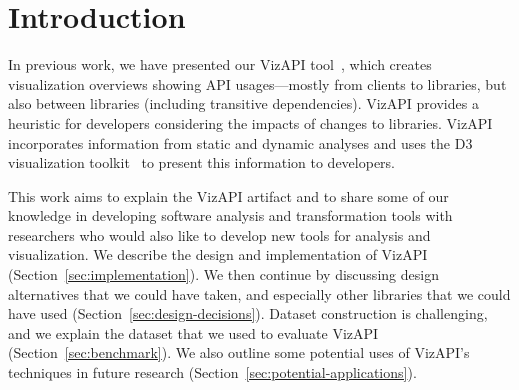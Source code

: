 \section{Introduction}
\label{sec:introduction}

In previous work, we have presented our VizAPI tool~\cite{venkatanarayanan22:_vizap,venkatanarayanan22:_study_lever_api_usage_patter}, which creates visualization overviews showing API usages---mostly from clients to libraries, but also between libraries (including transitive dependencies). VizAPI provides a heuristic for developers considering the impacts of changes to libraries. VizAPI incorporates information from static and dynamic analyses and uses the D3 visualization toolkit~\cite{bostock2011} to present this information to developers.

This work aims to explain the VizAPI artifact and to share some of our knowledge in developing software analysis and transformation tools with researchers who would also like to develop new tools for analysis and visualization. We describe the design and implementation of VizAPI (Section~\ref{sec:implementation}). We then continue by discussing design alternatives that we could have taken, and especially other libraries that we could have used (Section~\ref{sec:design-decisions}). Dataset construction is challenging, and we explain the dataset that we used to evaluate VizAPI (Section~\ref{sec:benchmark}). We also outline some potential uses of VizAPI's techniques in future research (Section~\ref{sec:potential-applications}).



